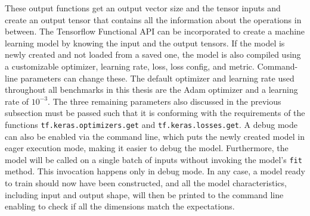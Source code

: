 \documentclass[draft,final]{vutinfth} %
\begin{document}
    These output functions get an output vector size and the tensor inputs and create an output tensor that contains all the information about the operations in between.
    The Tensorflow \cite{Tensorflow} Functional API can be incorporated to create a machine learning model by knowing the input and the output tensors.
    If the model is newly created and not loaded from a saved one, the model is also compiled using a customizable optimizer, learning rate, loss, loss config, and metric.
    Command-line parameters can change these.
    The default optimizer and learning rate used throughout all benchmarks in this thesis are the Adam optimizer \cite{Adam} and a learning rate of $10^{-3}$.
    The three remaining parameters also discussed in the previous subsection must be passed such that it is conforming with the requirements of the functions \texttt{tf.keras.optimizers.get} and \texttt{tf.keras.losses.get}.
    A debug mode can also be enabled via the command line, which puts the newly created model in eager execution mode, making it easier to debug the model. Furthermore, the model will be called on a single batch of inputs without invoking the model's \texttt{fit} method. This invocation happens only in debug mode.
    In any case, a model ready to train should now have been constructed, and all the model characteristics, including input and output shape, will then be printed to the command line enabling to check if all the dimensions match the expectations.
\end{document}
